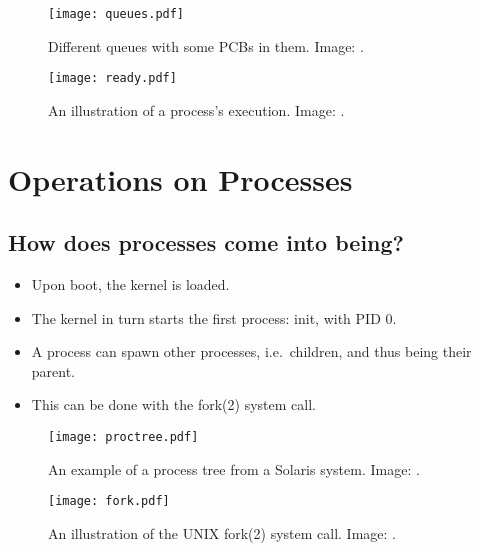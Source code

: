 \documentclass{beamer}
\begin{document}
\begin{frame}{\insertsubsectionhead}
  \begin{figure}
    \texttt{[image: queues.pdf]}
    \caption{Different queues with some PCBs in them.
      Image: \cite{Silberschatz2009osc}.}
  \end{figure}
\end{frame}

\begin{frame}{\insertsubsectionhead}
  \begin{figure}
    \texttt{[image: ready.pdf]}
    \caption{An illustration of a process's execution.
      Image: \cite{Silberschatz2009osc}.}
  \end{figure}
\end{frame}

\section[Operations]{Operations on Processes}

\subsection{How does processes come into being?}

\begin{frame}{\insertsubsectionhead}
  \begin{itemize}
    \item Upon boot, the kernel is loaded.
    \item The kernel in turn starts the first process: init, with PID 0.
    \item A process can spawn other processes, i.e.\ children, and thus being 
      their parent.
    \item This can be done with the fork(2) system call.
  \end{itemize}
\end{frame}

\begin{frame}{\insertsubsectionhead}
  \begin{figure}
    \texttt{[image: proctree.pdf]}
    \caption{An example of a process tree from a Solaris system.
      Image: \cite{Silberschatz2009osc}.}
  \end{figure}
\end{frame}

\begin{frame}{\insertsubsectionhead}
  \begin{figure}
    \texttt{[image: fork.pdf]}
    \caption{An illustration of the UNIX fork(2) system call.
      Image: \cite{Silberschatz2009osc}.}
  \end{figure}
\end{frame}
\end{document}
